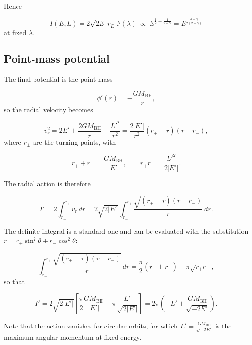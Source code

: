 Hence

\begin{equation}
I(E,L) = 2\sqrt{2E}\; r_E \; F(\lambda)
\;\propto\; E^{\frac{1}{2} + \frac{1}{2-\gamma}}
= E^{\frac{4-\gamma}{2(2-\gamma)}}
\end{equation}
at fixed $\lambda$. 




\subsection*{Point-mass potential}

The final potential is the point-mass

\begin{equation}
    \phi'(r) = -\frac{GM_{\mathrm{BH}}}{r},
\end{equation}
so the radial velocity becomes

\begin{equation}
v_r^2 = 2E' + \frac{2GM_{\mathrm{BH}}}{r} - \frac{L'^2}{r^2}
= \frac{2|E'|}{r^2} \left( r_+ - r \right)\left( r - r_- \right),
\end{equation}
where $r_\pm$ are the turning points, with

\begin{equation}
r_+ + r_- = \frac{GM_{\mathrm{BH}}}{|E'|},
\qquad
r_+ r_- = \frac{L'^2}{2|E'|} .
\end{equation}

The radial action is therefore

\begin{equation}
I' = 2 \int_{r_-}^{r_+} v_r\, dr
= 2\sqrt{2|E'|} \int_{r_-}^{r_+}
\frac{\sqrt{(r_+ - r)(r - r_-)}}{r}\; dr .
\end{equation}

The definite integral is a standard one and can be evaluated with the
substitution $r = r_+ \sin^2\theta + r_- \cos^2\theta$:

\begin{equation}
\int_{r_-}^{r_+} \frac{\sqrt{(r_+-r)(r-r_-)}}{r}\, dr
= \frac{\pi}{2}\left( r_+ + r_- \right) - \pi \sqrt{r_+ r_-} ,
\end{equation}
so that

\begin{equation}
I' = 2\sqrt{2|E'|} \left[ \frac{\pi}{2}\frac{GM_{\mathrm{BH}}}{|E'|}
- \pi \frac{L'}{\sqrt{2|E'|}} \right]
= 2\pi \left( -L' + \frac{GM_{\mathrm{BH}}}{\sqrt{-2E'}} \right) .
\end{equation}

Note that the action vanishes for circular orbits, for which
$L' = \frac{GM_{\mathrm{BH}}}{\sqrt{-2E'}}$ is the maximum angular momentum at fixed energy.





